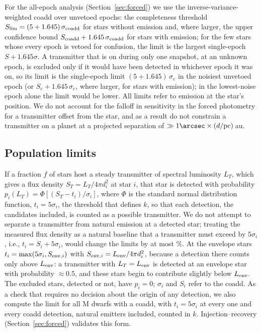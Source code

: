 \documentclass[linenumbers]{aastex702}
\begin{document}
For the all-epoch analysis (Section~\ref{sec:forced}) we use the inverse-variance-weighted coadd over unvetoed epochs: the completeness threshold $S_{\rm lim}=(5+1.645)\,\sigma_{\rm coadd}$ for stars without emission and, where larger, the upper confidence bound $S_{\rm coadd}+1.645\,\sigma_{\rm coadd}$ for stars with emission; for the few stars whose every epoch is vetoed for confusion, the limit is the largest single-epoch $S+1.645\sigma$. A transmitter that is on during only one snapshot, at an unknown epoch, is excluded only if it would have been detected in whichever epoch it was on, so its limit is the single-epoch limit $(5+1.645)\,\sigma_e$ in the noisiest unvetoed epoch (or $S_e+1.645\,\sigma_e$, where larger, for stars with emission); in the lowest-noise epoch alone the limit would be lower. All limits refer to emission at the star's position. We do not account for the falloff in sensitivity in the forced photometry for a transmitter offset from the star, and as a result do not constrain a transmitter on a planet at a projected separation of $\gg1\arcsec\times(d/{\rm pc})$\,au.

\subsection{Population limits} \label{sec:pop_method}

If a fraction $f$ of stars host a steady transmitter of spectral luminosity $L_T$, which gives a flux density $S_T=L_T/4\pi d_i^2$ at star $i$, that star is detected with probability $p_i(L_T)=\Phi[(S_T-t_i)/\sigma_i]$, where $\Phi$ is the standard normal distribution function, $t_i=5\sigma_i$, the threshold that defines $k$, so that each detection, the candidates included, is counted as a possible transmitter. We do not attempt to separate a transmitter from natural emission at a detected star; treating the measured flux density as a natural baseline that a transmitter must exceed by $5\sigma_i$, i.e., $t_i=S_i+5\sigma_i$, would change the limits by at most \AddDiffPct\%. At the envelope stars $t_i=\max(5\sigma_i,S_{{\rm env},i})$ with $S_{{\rm env},i}=L_{\rm env}/4\pi d_i^2$, because a detection there counts only above $L_{\rm env}$: a transmitter with $L_T=L_{\rm env}$ is detected at an envelope star with probability $\approx0.5$, and these stars begin to contribute slightly below $L_{\rm env}$. The excluded stars, detected or not, have $p_i=0$; $\sigma_i$ and $S_i$ refer to the coadd. As a check that requires no decision about the origin of any detection, we also compute the limit for all M dwarfs with a coadd, with $t_i=5\sigma_i$ at every one and every coadd detection, natural emitters included, counted in $k$. Injection--recovery (Section~\ref{sec:forced}) validates this form.
\end{document}
